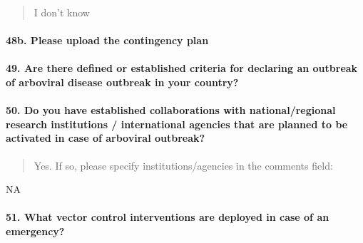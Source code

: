 \documentclass[
]{article}
\begin{document}
\begin{quote}
I don't know
\end{quote}

\hypertarget{b.-please-upload-the-contingency-plan}{%
\paragraph{48b. Please upload the contingency
plan}\label{b.-please-upload-the-contingency-plan}}

\begin{quote}
\end{quote}

\hypertarget{are-there-defined-or-established-criteria-for-declaring-an-outbreak-of-arboviral-disease-outbreak-in-your-country}{%
\paragraph{49. Are there defined or established criteria for declaring
an outbreak of arboviral disease outbreak in your
country?}\label{are-there-defined-or-established-criteria-for-declaring-an-outbreak-of-arboviral-disease-outbreak-in-your-country}}

\begin{quote}
\end{quote}

\hypertarget{do-you-have-established-collaborations-with-nationalregional-research-institutions-international-agencies-that-are-planned-to-be-activated-in-case-of-arboviral-outbreak}{%
\paragraph{50. Do you have established collaborations with
national/regional research institutions / international agencies that
are planned to be activated in case of arboviral
outbreak?}\label{do-you-have-established-collaborations-with-nationalregional-research-institutions-international-agencies-that-are-planned-to-be-activated-in-case-of-arboviral-outbreak}}

\begin{quote}
Yes. If so, please specify institutions/agencies in the comments field:
\end{quote}

NA

\hypertarget{what-vector-control-interventions-are-deployed-in-case-of-an-emergency}{%
\paragraph{51. What vector control interventions are deployed in case of
an
emergency?}\label{what-vector-control-interventions-are-deployed-in-case-of-an-emergency}}
\end{document}
